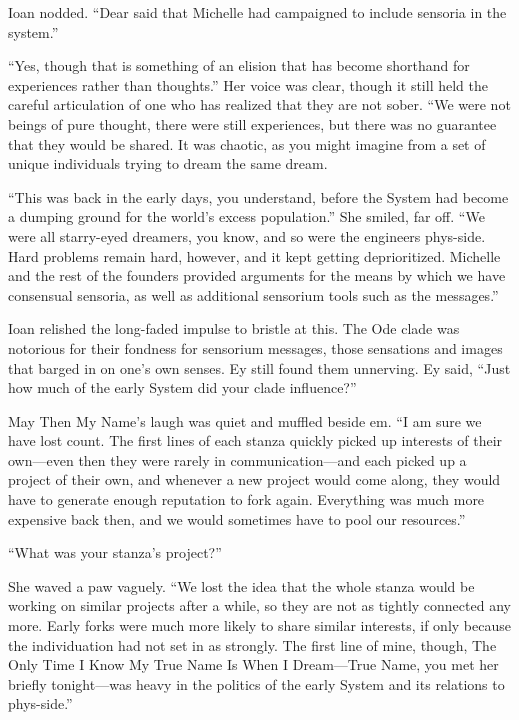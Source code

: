 Ioan nodded. ``Dear said that Michelle had campaigned to include sensoria in the system.''\pagebreak

``Yes, though that is something of an elision that has become shorthand for experiences rather than thoughts.'' Her voice was clear, though it still held the careful articulation of one who has realized that they are not sober. ``We were not beings of pure thought, there were still experiences, but there was no guarantee that they would be shared. It was chaotic, as you might imagine from a set of unique individuals trying to dream the same dream.

``This was back in the early days, you understand, before the System had become a dumping ground for the world's excess population.'' She smiled, far off. ``We were all starry-eyed dreamers, you know, and so were the engineers phys-side. Hard problems remain hard, however, and it kept getting deprioritized. Michelle and the rest of the founders provided arguments for the means by which we have consensual sensoria, as well as additional sensorium tools such as the messages.''

Ioan relished the long-faded impulse to bristle at this. The Ode clade was notorious for their fondness for sensorium messages, those sensations and images that barged in on one's own senses. Ey still found them unnerving. Ey said, ``Just how much of the early System did your clade influence?''

May Then My Name's laugh was quiet and muffled beside em. ``I am sure we have lost count. The first lines of each stanza quickly picked up interests of their own---even then they were rarely in communication---and each picked up a project of their own, and whenever a new project would come along, they would have to generate enough reputation to fork again. Everything was much more expensive back then, and we would sometimes have to pool our resources.''

``What was your stanza's project?''

She waved a paw vaguely. ``We lost the idea that the whole stanza would be working on similar projects after a while, so they are not as tightly connected any more. Early forks were much more likely to share similar interests, if only because the individuation had not set in as strongly. The first line of mine, though, The Only Time I Know My True Name Is When I Dream---True Name, you met her briefly tonight---was heavy in the politics of the early System and its relations to phys-side.''


